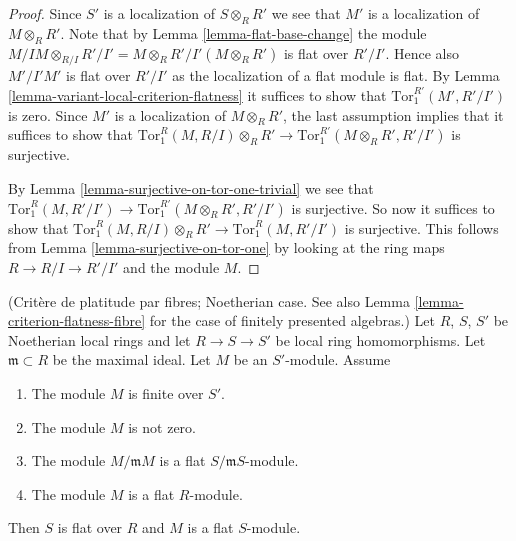 \begin{proof}
Since $S'$ is a localization of $S \otimes_R R'$ we see that
$M'$ is a localization of $M \otimes_R R'$. Note that
by Lemma \ref{lemma-flat-base-change} the module $M/IM \otimes_{R/I} R'/I'
= M \otimes_R R' /I'(M \otimes_R R')$ is flat over $R'/I'$. Hence also
$M'/I'M'$ is flat over $R'/I'$ as the localization of a flat module
is flat. By Lemma \ref{lemma-variant-local-criterion-flatness}
it suffices to show that $\text{Tor}_1^{R'}(M', R'/I')$ is zero.
Since $M'$ is a localization of $M \otimes_R R'$, the last assumption
implies that it suffices to show that
$\text{Tor}_1^R(M, R/I) \otimes_R R'
\to
\text{Tor}_1^{R'}(M \otimes_R R', R'/I')$
is surjective.

\medskip\noindent
By Lemma \ref{lemma-surjective-on-tor-one-trivial} we see that
$\text{Tor}_1^R(M, R'/I') \to \text{Tor}_1^{R'}(M\otimes_R R', R'/I')$
is surjective. So now it suffices to show that
$\text{Tor}_1^R(M, R/I) \otimes_R R'
\to
\text{Tor}_1^R(M, R'/I')$
is surjective. This follows from Lemma \ref{lemma-surjective-on-tor-one}
by looking at the ring maps $R \to R/I \to R'/I'$ and the module $M$.
\end{proof}

\begin{lemma}
\label{lemma-criterion-flatness-fibre-Noetherian}
(Crit\`ere de platitude par fibres; Noetherian case.
See also Lemma \ref{lemma-criterion-flatness-fibre}
for the case of finitely presented algebras.)
Let $R$, $S$, $S'$ be Noetherian local rings and let $R \to S \to S'$
be local ring homomorphisms. Let $\mathfrak m \subset R$ be the
maximal ideal. Let $M$ be an $S'$-module. Assume
\begin{enumerate}
\item The module $M$ is finite over $S'$.
\item The module $M$ is not zero.
\item The module $M/\mathfrak m M$
is a flat $S/\mathfrak m S$-module.
\item The module $M$ is a flat $R$-module.
\end{enumerate}
Then $S$ is flat over $R$ and $M$ is a flat $S$-module.
\end{lemma}


